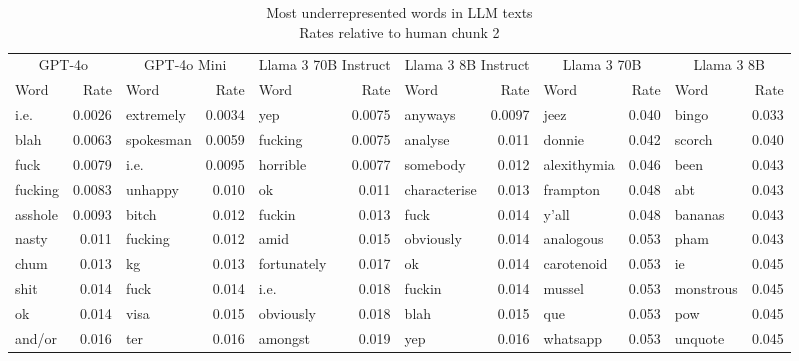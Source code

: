 \begin{table}[!t]
\caption*{
{\large Most underrepresented words in LLM texts} \\ 
{\small Rates relative to human chunk 2}
} 
\fontsize{12.0pt}{14.4pt}\selectfont
\begin{tabular*}{\linewidth}{@{\extracolsep{\fill}}lrlrlrlrlrlr}
\toprule
\multicolumn{2}{c}{GPT-4o} & \multicolumn{2}{c}{GPT-4o Mini} & \multicolumn{2}{c}{Llama 3 70B Instruct} & \multicolumn{2}{c}{Llama 3 8B Instruct} & \multicolumn{2}{c}{Llama 3 70B} & \multicolumn{2}{c}{Llama 3 8B} \\ 
\cmidrule(lr){1-2} \cmidrule(lr){3-4} \cmidrule(lr){5-6} \cmidrule(lr){7-8} \cmidrule(lr){9-10} \cmidrule(lr){11-12}
Word & Rate & Word & Rate & Word & Rate & Word & Rate & Word & Rate & Word & Rate \\ 
\midrule\addlinespace[2.5pt]
i.e. & 0.0026 & extremely & 0.0034 & yep & 0.0075 & anyways & 0.0097 & jeez & 0.040 & bingo & 0.033 \\ 
blah & 0.0063 & spokesman & 0.0059 & fucking & 0.0075 & analyse & 0.011 & donnie & 0.042 & scorch & 0.040 \\ 
fuck & 0.0079 & i.e. & 0.0095 & horrible & 0.0077 & somebody & 0.012 & alexithymia & 0.046 & been & 0.043 \\ 
fucking & 0.0083 & unhappy & 0.010 & ok & 0.011 & characterise & 0.013 & frampton & 0.048 & abt & 0.043 \\ 
asshole & 0.0093 & bitch & 0.012 & fuckin & 0.013 & fuck & 0.014 & y'all & 0.048 & bananas & 0.043 \\ 
nasty & 0.011 & fucking & 0.012 & amid & 0.015 & obviously & 0.014 & analogous & 0.053 & pham & 0.043 \\ 
chum & 0.013 & kg & 0.013 & fortunately & 0.017 & ok & 0.014 & carotenoid & 0.053 & ie & 0.045 \\ 
shit & 0.014 & fuck & 0.014 & i.e. & 0.018 & fuckin & 0.014 & mussel & 0.053 & monstrous & 0.045 \\ 
ok & 0.014 & visa & 0.015 & obviously & 0.018 & blah & 0.015 & que & 0.053 & pow & 0.045 \\ 
and/or & 0.016 & ter & 0.016 & amongst & 0.019 & yep & 0.016 & whatsapp & 0.053 & unquote & 0.045 \\ 
\bottomrule
\end{tabular*}
\end{table}

